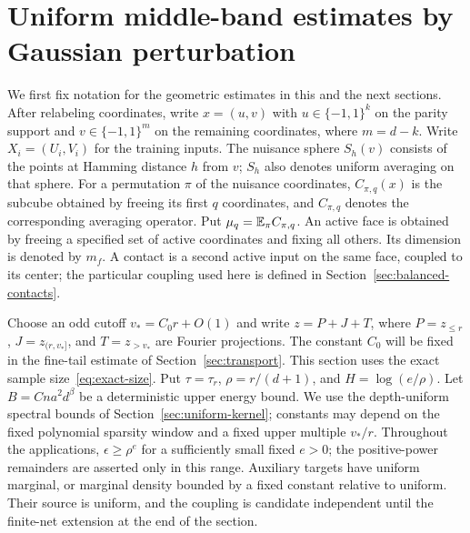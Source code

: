 \section{Uniform middle-band estimates by Gaussian perturbation}
\label{sec:middle-pac}
We first fix notation for the geometric estimates in this and the next
sections. After relabeling coordinates, write $x=(u,v)$ with
$u\in\{-1,1\}^k$ on the parity support and
$v\in\{-1,1\}^{m}$ on the remaining coordinates, where $m=d-k$.
Write $X_i=(U_i,V_i)$ for the training inputs. The nuisance sphere
$S_h(v)$ consists of the points at Hamming distance $h$ from $v$;
$S_h$ also denotes uniform averaging on that sphere. For a permutation
$\pi$ of the nuisance coordinates, $C_{\pi,q}(x)$ is the subcube
obtained by freeing its first $q$ coordinates, and $C_{\pi,q}$ denotes
the corresponding averaging operator. Put $\mu_q=\mathbb E_\pi C_{\pi,q}$.
An active face is obtained by freeing a specified set of active
coordinates and fixing all others. Its dimension is denoted by $m_f$.
A contact is a second active input on the same face, coupled to its
center; the particular coupling used here is defined in
Section~\ref{sec:balanced-contacts}.

Choose an odd cutoff $v_*=C_0r+O(1)$ and write
$z=P+J+T$, where $P=z_{\le r}$, $J=z_{(r,v_*]}$, and $T=z_{>v_*}$
are Fourier projections. The constant $C_0$ will be fixed in the
fine-tail estimate of Section~\ref{sec:transport}.
This section uses the exact sample size~\eqref{eq:exact-size}. Put
$\tau=\tau_r$, $\rho=r/(d+1)$, and $H=\log(e/\rho)$.
Let $B=Cna^2d^\beta$ be a deterministic upper energy bound. We use the
depth-uniform spectral bounds of Section~\ref{sec:uniform-kernel};
constants may depend on the fixed polynomial sparsity window and a
fixed upper multiple $v_*/r$. Throughout the applications, $\epsilon\ge\rho^e$
for a sufficiently small fixed $e>0$; the positive-power remainders are
asserted only in this range. Auxiliary targets have uniform marginal,
or marginal density bounded by a fixed constant relative to uniform.
Their source is uniform, and the coupling is candidate independent
until the finite-net extension at the end of the section.

